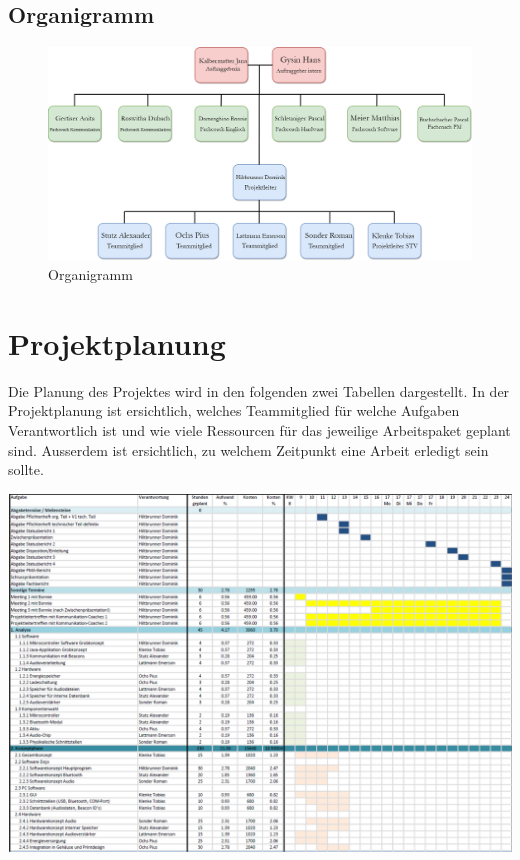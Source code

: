 \documentclass[10pt,a4paper,oneside]{99_fhnwreport}
\begin{document}
\begin{landscape}
\subsection{Organigramm}\label{subsec:organigramm}


\begin{figure}[htbp]
	\centering
	\includegraphics[scale=0.40]{pro4E_Struktur.png}
	\caption{Organigramm}
\end{figure}

\section{Projektplanung}\label{sec:projektplanung}
Die Planung des Projektes wird in den folgenden zwei Tabellen dargestellt.
In der Projektplanung ist ersichtlich, welches Teammitglied für welche Aufgaben Verantwortlich ist und wie viele Ressourcen für das jeweilige Arbeitspaket geplant sind. Ausserdem ist ersichtlich, zu welchem Zeitpunkt eine Arbeit erledigt sein sollte.

\includegraphics[height=\dimexpr\textheight-4\baselineskip\relax,page=1]{projektplan_1.pdf}
\newpage


\end{landscape}
\end{document}
